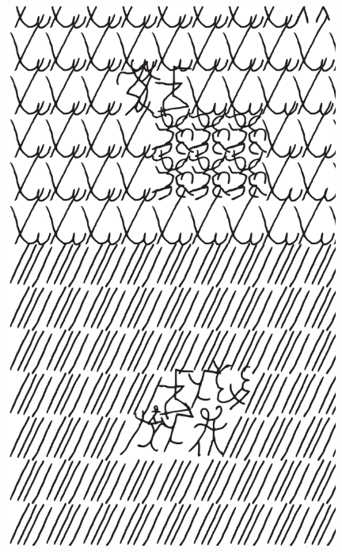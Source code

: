 \makeatletter\@openrightfalse
\movetooddpage
\begin{absolutelynopagebreak}
\begin{vplace}
\begin{figure}[H]
\begin{adjustwidth}{-0.99cm}{}
  \centering
  \vspace*{-1.77cm}
  \includegraphics[width=110mm]{./imgs/img13.pdf}  
  \hfill
\end{adjustwidth}

\thispagestyle{empty}

\end{figure}
\end{vplace}

\end{absolutelynopagebreak}

